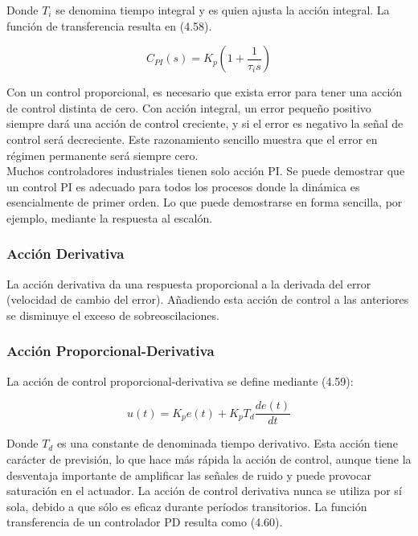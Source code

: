 \documentclass[a4paper,12pt,twoside]{proyectotanquesecci}
\begin{document}
Donde $T_{i}$ se denomina tiempo integral y es quien ajusta la acción integral. La función de transferencia resulta en (4.58).

\begin{equation}
C_{PI}\left( s\right) =  K_{p}\left( 1+\frac{1}{\tau _{i}s}\right)
\end{equation}

Con un control proporcional, es necesario que exista error para tener una acción de control distinta de cero. Con acción integral, un error pequeño positivo siempre dará una acción de control creciente, y si el error es negativo la señal de control será decreciente. Este razonamiento sencillo muestra que el error en régimen permanente será siempre cero. \\

Muchos controladores industriales tienen solo acción PI. Se puede demostrar que un control PI es adecuado para todos los procesos donde la dinámica es esencialmente de primer orden. Lo que puede demostrarse en forma sencilla, por ejemplo, mediante la respuesta al escalón.

\subsubsection*{Acción Derivativa}

La acción derivativa da una respuesta proporcional a la derivada del error (velocidad de cambio del error). Añadiendo esta acción de control a las anteriores se disminuye el exceso de sobreoscilaciones.

\subsubsection*{Acción Proporcional-Derivativa}

La acción de control proporcional-derivativa se define mediante (4.59):

\begin{equation}
u\left( t\right) =K_{p}e\left( t\right) +K_{p}T_{d}\frac{de\left( t\right)}{dt}
\end{equation}

Donde $T_{d}$ es una constante de denominada tiempo derivativo. Esta acción tiene carácter de previsión, lo que hace más rápida la acción de control, aunque tiene la desventaja importante de amplificar las señales de ruido y puede provocar saturación en el actuador. La acción de control derivativa nunca se utiliza por sí sola, debido a que sólo es eficaz durante períodos transitorios. La función transferencia de un controlador PD resulta como (4.60).
\end{document}

